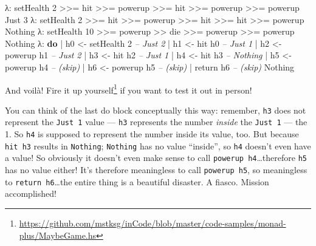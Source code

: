 \documentclass[]{article}
\newenvironment{Shaded}{}{}
\newcommand{\KeywordTok}[1]{\textcolor[rgb]{0.00,0.44,0.13}{\textbf{{#1}}}}
\newcommand{\DataTypeTok}[1]{\textcolor[rgb]{0.56,0.13,0.00}{{#1}}}
\newcommand{\DecValTok}[1]{\textcolor[rgb]{0.25,0.63,0.44}{{#1}}}
\newcommand{\CommentTok}[1]{\textcolor[rgb]{0.38,0.63,0.69}{\textit{{#1}}}}
\newcommand{\OtherTok}[1]{\textcolor[rgb]{0.00,0.44,0.13}{{#1}}}
\newcommand{\FunctionTok}[1]{\textcolor[rgb]{0.02,0.16,0.49}{{#1}}}
\newcommand{\NormalTok}[1]{{#1}}
\renewcommand{\href}[2]{#2\footnote{\url{#1}}}
\begin{document}
\begin{Shaded}
\begin{Highlighting}[]
\NormalTok{λ}\FunctionTok{:} \NormalTok{setHealth }\DecValTok{2} \FunctionTok{>>=} \NormalTok{hit }\FunctionTok{>>=} \NormalTok{powerup }\FunctionTok{>>=} \NormalTok{hit }\FunctionTok{>>=} \NormalTok{powerup }\FunctionTok{>>=} \NormalTok{powerup}
\DataTypeTok{Just} \DecValTok{3}
\NormalTok{λ}\FunctionTok{:} \NormalTok{setHealth }\DecValTok{2} \FunctionTok{>>=} \NormalTok{hit }\FunctionTok{>>=} \NormalTok{powerup }\FunctionTok{>>=} \NormalTok{hit }\FunctionTok{>>=} \NormalTok{hit }\FunctionTok{>>=} \NormalTok{powerup}
\DataTypeTok{Nothing}
\NormalTok{λ}\FunctionTok{:} \NormalTok{setHealth }\DecValTok{10} \FunctionTok{>>=} \NormalTok{powerup }\FunctionTok{>>} \NormalTok{die }\FunctionTok{>>=} \NormalTok{powerup }\FunctionTok{>>=} \NormalTok{powerup}
\DataTypeTok{Nothing}
\NormalTok{λ}\FunctionTok{:} \KeywordTok{do}
 \FunctionTok{|}     \NormalTok{h0 }\OtherTok{<-} \NormalTok{setHealth }\DecValTok{2}        \CommentTok{-- Just 2}
 \FunctionTok{|}     \NormalTok{h1 }\OtherTok{<-} \NormalTok{hit h0             }\CommentTok{-- Just 1}
 \FunctionTok{|}     \NormalTok{h2 }\OtherTok{<-} \NormalTok{powerup h1         }\CommentTok{-- Just 2}
 \FunctionTok{|}     \NormalTok{h3 }\OtherTok{<-} \NormalTok{hit h2             }\CommentTok{-- Just 1}
 \FunctionTok{|}     \NormalTok{h4 }\OtherTok{<-} \NormalTok{hit h3             }\CommentTok{-- Nothing}
 \FunctionTok{|}     \NormalTok{h5 }\OtherTok{<-} \NormalTok{powerup h4         }\CommentTok{-- (skip)}
 \FunctionTok{|}     \NormalTok{h6 }\OtherTok{<-} \NormalTok{powerup h5         }\CommentTok{-- (skip)}
 \FunctionTok{|}     \NormalTok{return h6                }\CommentTok{-- (skip)}
\DataTypeTok{Nothing}
\end{Highlighting}
\end{Shaded}

And voilà!
\href{https://github.com/mstksg/inCode/blob/master/code-samples/monad-plus/MaybeGame.hs}{Fire it up
yourself} if you want to test it out in person!

You can think of the last do block conceptually this way: remember, \texttt{h3} does not represent
the \texttt{Just\ 1} value --- \texttt{h3} represents the number \emph{inside} the \texttt{Just\ 1}
--- the 1. So \texttt{h4} is supposed to represent the number inside its value, too. But because
\texttt{hit\ h3} results in \texttt{Nothing}; \texttt{Nothing} has no value ``inside'', so
\texttt{h4} doesn't even have a value! So obviously it doesn't even make sense to call
\texttt{powerup\ h4}\ldots{}therefore \texttt{h5} has no value either! It's therefore meaningless to
call \texttt{powerup\ h5}, so meaningless to \texttt{return\ h6}\ldots{}the entire thing is a
beautiful disaster. A fiasco. Mission accomplished!
\end{document}
